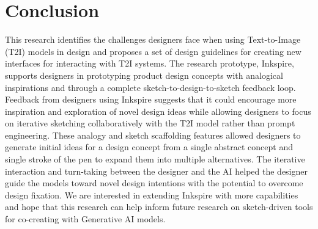 \documentclass[sigconf, screen]{acmart}
\begin{document}

\section{Conclusion}
This research identifies the challenges designers face when using Text-to-Image (T2I) models in design and proposes a set of design guidelines for creating new interfaces for interacting with T2I systems. The research prototype, Inkspire, supports designers in prototyping product design concepts with analogical inspirations and through a complete sketch-to-design-to-sketch feedback loop.
Feedback from designers using Inkspire suggests that it could encourage more inspiration and exploration of novel design ideas while allowing designers to focus on iterative sketching collaboratively with the T2I model rather than prompt engineering.
These analogy and sketch scaffolding features allowed designers to generate initial ideas for a design concept from a single abstract concept and single stroke of the pen to expand them into multiple alternatives. 
The iterative interaction and turn-taking between the designer and the AI helped the designer guide the models toward novel design intentions with the potential to overcome design fixation.
We are interested in extending Inkspire with more capabilities and hope that this research can help inform future research on sketch-driven tools for co-creating with Generative AI models.



\end{document}

